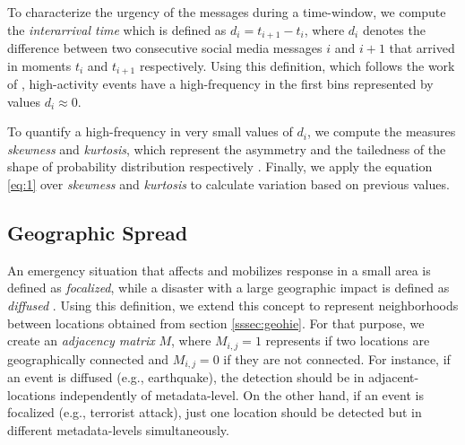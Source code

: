 \documentclass[sigconf]{acmart}
\begin{document}
To characterize the urgency of the messages during a time-window, we compute the \textit{interarrival time} which is defined as $d_{i} = t_{i+1} - t_{i}$, where $d_{i}$ denotes the difference between two consecutive social media messages $i$ and $i+1$ that arrived in moments $t_{i}$ and $t_{i+1}$ respectively. Using this definition, which follows the work of \citeauthor{kalyanam2016prediction} \cite{kalyanam2016prediction}, high-activity events have a high-frequency in the first bins represented by values $d_{i} \approx 0$. 

To quantify a high-frequency in very small values of $d_{i}$, we compute the measures \textit{skewness} and \textit{kurtosis}, which represent the asymmetry and the tailedness of the shape of probability distribution respectively \cite{mardia1970measures}. Finally, we apply the equation \ref{eq:1} over \textit{skewness} and \textit{kurtosis} to calculate variation based on previous values.


\subsection{Geographic Spread}\label{sssec:geospread}

An emergency situation that affects and mobilizes response in a small area is defined as \textit{focalized}, while a disaster with a large geographic impact is defined as \textit{diffused} \cite{olteanu2015expect}. Using this definition, we extend this concept to represent neighborhoods between locations obtained from section \ref{sssec:geohie}. For that purpose, we create an \textit{adjacency matrix} $M$, where $M_{i,j} = 1$ represents if two locations are geographically connected and $M_{i,j} = 0$ if they are not connected. For instance, if an event is diffused (e.g., earthquake), the detection should be in adjacent-locations independently of metadata-level. On the other hand, if an event is focalized (e.g., terrorist attack), just one location should be detected but in different metadata-levels simultaneously.
\end{document}
